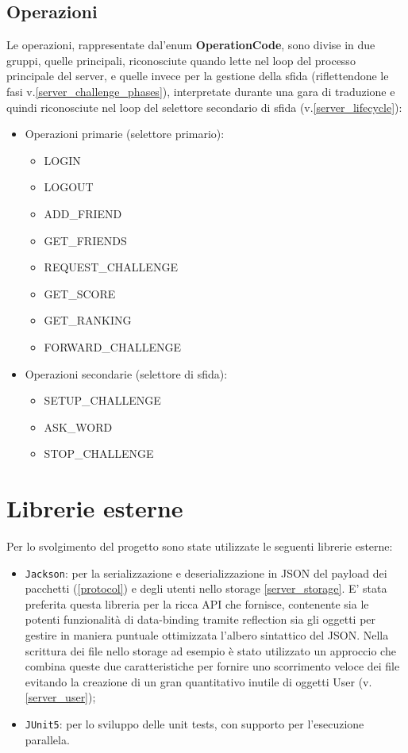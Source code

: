 \documentclass{article}
\begin{document}
    \subsection{Operazioni}\label{protocol_operations}
    Le operazioni, rappresentate dal'enum \textbf{OperationCode}, sono divise in due gruppi, quelle principali, riconosciute quando lette nel loop del processo principale del server, e quelle invece per la gestione della sfida (riflettendone le fasi v.\ref{server_challenge_phases}), interpretate durante una gara di traduzione e quindi riconosciute nel loop del selettore secondario di sfida (v.\ref{server_lifecycle}):
    \begin{itemize}
        \item Operazioni primarie (selettore primario):
            \begin{itemize}
                \item LOGIN
                \item LOGOUT
                \item ADD\_FRIEND
                \item GET\_FRIENDS
                \item REQUEST\_CHALLENGE
                \item GET\_SCORE
                \item GET\_RANKING
                \item FORWARD\_CHALLENGE
            \end{itemize}
        \item Operazioni secondarie (selettore di sfida):
            \begin{itemize}
                \item SETUP\_CHALLENGE
                \item ASK\_WORD
                \item STOP\_CHALLENGE
            \end{itemize}
    \end{itemize}


    \section{Librerie esterne}\label{external_libraries}
    Per lo svolgimento del progetto sono state utilizzate le seguenti librerie esterne:
    \begin{itemize}
        \item \texttt{Jackson}: per la serializzazione e deserializzazione in JSON del payload dei pacchetti (\ref{protocol}) e degli utenti nello storage \ref{server_storage}. E' stata preferita questa libreria per la ricca API che fornisce, contenente sia le potenti funzionalità di data-binding tramite reflection sia gli oggetti per gestire in maniera puntuale ottimizzata l'albero sintattico del JSON. Nella scrittura dei file nello storage ad esempio è stato utilizzato un approccio che combina queste due caratteristiche per fornire uno scorrimento veloce dei file evitando la creazione di un gran quantitativo inutile di oggetti User (v. \ref{server_user});
        \item \texttt{JUnit5}: per lo sviluppo delle unit tests, con supporto per l'esecuzione parallela.
    \end{itemize}
\end{document}
